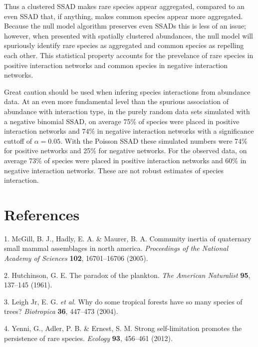 \documentclass[]{article}
\begin{document}
Thus a clustered SSAD makes rare species appear aggregated, compared to
an even SSAD that, if anything, makes common species appear more
aggregated. Because the null model algorithm preserves even SSADs this
is less of an issue; however, when presented with spatially clustered
abundances, the null model will spuriously identify rare species as
aggregated and common species as repelling each other. This statistical
property accounts for the prevelance of rare species in positive
interaction networks and common species in negative interaction
networks.

Great caution should be used when infering species interactions from
abundance data. At an even more fundamental level than the spurious
association of abundance with interaction type, in the purely random
data sets simulated with a negative binomial SSAD, on average 75\% of
species were placed in positive interaction networks and 74\% in
negative interaction networks with a significance cuttoff of
\(\alpha = 0.05\). With the Poisson SSAD these simulated numbers were
74\% for positive networks and 25\% for negative networks. For the
observed data, on average 73\% of species were placed in positive
interaction networks and 60\% in negative interaction networks. These
are not robust estimates of species interaction.

\clearpage

\section*{References}\label{references}

\hypertarget{refs}{}
\hypertarget{ref-mcgill2005}{}
1. McGill, B. J., Hadly, E. A. \& Maurer, B. A. Community inertia of
quaternary small mammal assemblages in north america. \emph{Proceedings
of the National Academy of Sciences} \textbf{102}, 16701--16706 (2005).

\hypertarget{ref-hutchinson1961}{}
2. Hutchinson, G. E. The paradox of the plankton. \emph{The American
Naturalist} \textbf{95}, 137--145 (1961).

\hypertarget{ref-leigh2004}{}
3. Leigh Jr, E. G. \emph{et al.} Why do some tropical forests have so
many species of trees? \emph{Biotropica} \textbf{36}, 447--473 (2004).

\hypertarget{ref-yenni2012}{}
4. Yenni, G., Adler, P. B. \& Ernest, S. M. Strong self-limitation
promotes the persistence of rare species. \emph{Ecology} \textbf{93},
456--461 (2012).
\end{document}
